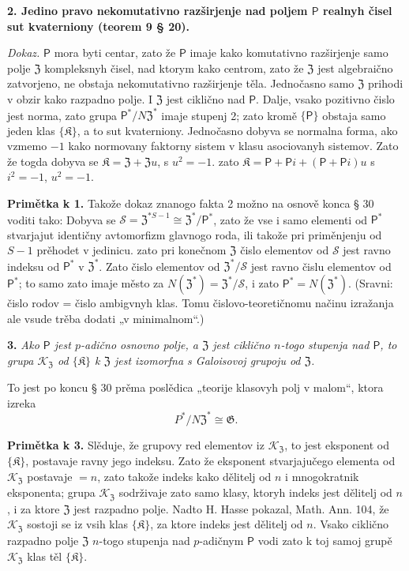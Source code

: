 \documentclass[11pt]{article}
\begin{document}
\noindent\textbf{2. Jedino pravo nekomutativno razširjenje nad poljem \(\mathsf{P}\) realnyh čisel sut kvaterniony (teorem 9 § 20).}

\noindent\emph{Dokaz.} \(\mathsf{P}\) mora byti centar, zato že \(\mathsf{P}\) imaje kako komutativno razširjenje samo polje \(\mathfrak Z\) kompleksnyh čisel, nad ktorym kako centrom, zato že \(\mathfrak Z\) jest algebraično zatvorjeno, ne obstaja nekomutativno razširjenje těla. Jednočasno samo \(\mathfrak Z\) prihodi v obzir kako razpadno polje. I \(\mathfrak Z\) jest ciklično nad \(\mathsf{P}\). Dalje, vsako pozitivno čislo jest norma, zato grupa \(\mathsf{P}^*/N\mathfrak Z^*\) imaje stupenj 2; zato kromě \(\{\mathsf{P}\}\) obstaja samo jeden klas \(\{\mathfrak K\}\), a to sut kvaterniony. Jednočasno dobyva se normalna forma, ako vzmemo \(-1\) kako normovany faktorny sistem v klasu asociovanyh sistemov. Zato že togda dobyva se \(\mathfrak K=\mathfrak Z+\mathfrak Zu\), s \(u^2=-1\). zato \(\mathfrak K=\mathsf P+\mathsf Pi+(\mathsf P+\mathsf Pi)u\) s \(i^2=-1\), \(u^2=-1\).

\noindent\textbf{Primětka k 1.} Takože dokaz znanogo fakta 2 možno na osnově konca § 30 voditi tako: Dobyva se \(\mathscr S=\mathfrak Z^{*S-1}\cong\mathfrak Z^*/\mathsf{P}^*\), zato že vse i samo elementi od \(\mathsf{P}^*\) stvarjajut identičny avtomorfizm glavnogo roda, ili takože pri priměnjenju od \(S-1\) prěhodet v jedinicu. zato pri konečnom \(\mathfrak Z\) čislo elementov od \(\mathscr S\) jest ravno indeksu od \(\mathsf{P}^*\) v \(\mathfrak Z^*\). Zato čislo elementov od \(\mathfrak Z^*/\mathscr S\) jest ravno čislu elementov od \(\mathsf{P}^*\); to samo zato imaje město za \(N(\mathfrak Z^*)=\mathfrak Z^*/\mathscr S\), i zato \(\mathsf{P}^*=N(\mathfrak Z^*)\). (Sravni: čislo rodov = čislo ambigvnyh klas. Tomu čislovo-teoretičnomu načinu izražanja ale vsude trěba dodati „v minimalnom“.)

\noindent\textbf{3.} \emph{Ako \(\mathsf{P}\) jest \(p\)-adično osnovno polje, a \(\mathfrak Z\) jest ciklično \(n\)-togo stupenja nad \(\mathsf{P}\), to grupa \(\mathscr K_{\mathfrak Z}\) od \(\{\mathfrak K\}\) k \(\mathfrak Z\) jest izomorfna s Galoisovoj grupoju od \(\mathfrak Z\).}

To jest po koncu § 30 prěma poslědica „teorije klasovyh polj v malom“, ktora izreka
\[
P^*/N\mathfrak Z^*\cong\mathfrak G.
\]

\noindent\textbf{Primětka k 3.} Slěduje, že grupovy red elementov iz \(\mathscr K_{\mathfrak Z}\), to jest eksponent od \(\{\mathfrak K\}\), postavaje ravny jego indeksu. Zato že eksponent stvarjajučego elementa od \(\mathscr K_{\mathfrak Z}\) postavaje \(=n\), zato takože indeks kako dělitelj od \(n\) i mnogokratnik eksponenta; grupa \(\mathscr K_{\mathfrak Z}\) sodrživaje zato samo klasy, ktoryh indeks jest dělitelj od \(n\), i za ktore \(\mathfrak Z\) jest razpadno polje. Nadto H. Hasse pokazal, Math. Ann. 104, že \(\mathscr K_{\mathfrak Z}\) sostoji se iz vsih klas \(\{\mathfrak K\}\), za ktore indeks jest dělitelj od \(n\). Vsako ciklično razpadno polje \(\mathfrak Z\) \(n\)-togo stupenja nad \(p\)-adičnym \(\mathsf{P}\) vodi zato k toj samoj grupě \(\mathscr K_{\mathfrak Z}\) klas těl \(\{\mathfrak K\}\).
\end{document}
